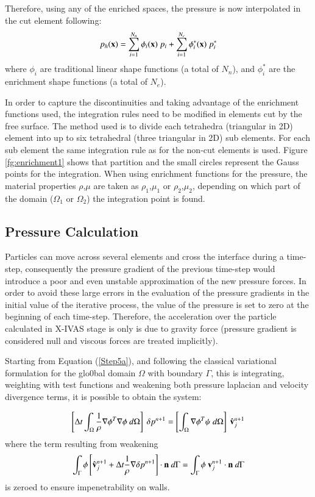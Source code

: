 Therefore, using any of the enriched spaces, the pressure is now interpolated in the cut element following:
 \begin{equation}
      p_h(\mathbf{x}) = \sum_{i=1}^{N_n} \phi_i(\mathbf{x}) \ p_i + \sum_{i=1}^{N_e} \phi_i^*(\mathbf{x}) \ p_i^*
   \end{equation}
where $\phi_i$ are traditional linear shape functions (a total of $N_n$), and $\phi_i^*$ are the enrichment shape functions (a total of $N_e$).

In order to capture the discontinuities and taking advantage of the enrichment functions used, the integration rules need to be modified in elements cut by the free surface. The method used is to divide each tetrahedra (triangular in 2D) element into up to six tetrahedral
(three triangular in 2D) sub elements. For each sub element the same integration rule as for the non-cut elements is used. Figure \ref{fg:enrichment1} shows that partition and the small circles represent the Gauss points for the integration. When using enrichment functions for the pressure, the material properties $\rho$,$\mu$ are taken as $\rho_1$,$\mu_1$ or $\rho_2$,$\mu_2$, depending on which part of the domain ($\Omega_1$ or $\Omega_2$) the integration point is found.

   \subsection{Pressure Calculation}

Particles can move across several elements and cross the interface during a time-step, consequently the pressure gradient of the previous time-step would introduce a poor and even unstable approximation of the new pressure forces. In order to avoid these large errors in the evaluation of the pressure gradients in the initial value of the iterative process, the value of the pressure is set to zero at the beginning of each time-step. Therefore, the acceleration over the particle calculated in X-IVAS stage is only is due to gravity force (pressure gradient is considered null and viscous forces are treated implicitly)\cite{Idelsohn13c}.

Starting from Equation (\ref{Step5a}), and following the classical variational formulation for the glo0bal domain $\Omega$ with boundary $\Gamma$, this is integrating, weighting with test functions and weakening both pressure laplacian and velocity divergence terms, it is possible to obtain the system:

\begin{equation}
   \left[\Delta t \int_{\Omega} \frac{1}{\rho} \nabla \phi^T \nabla \phi \ d\Omega\right]\ \delta p^{n+1} = \left[\int_{\Omega} \nabla \phi^T \psi \ d\Omega\right]\ \hat {\mathbf{v}}_j^{n+1}
\label{poisson}
\end{equation}
where the term resulting from weakening
\begin{equation}
\displaystyle \int_{\Gamma} \phi \left[ \hat {\mathbf{v}}_j^{n+1} + \Delta t \frac{1}{\rho} \nabla  \delta p^{n+1} \right] \cdot \mathbf{n} \ d\Gamma = \int_{\Gamma} \phi \ \mathbf{v}_j^{n+1} \cdot \mathbf{n} \ d\Gamma
\end{equation}
 is zeroed to ensure impenetrability on walls.

